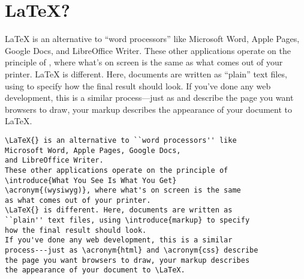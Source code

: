\section{\texorpdfstring{\LaTeX}{LaTeX}?}

\LaTeX{} is an alternative to ``word processors'' like
Microsoft Word, Apple Pages, Google Docs,
and LibreOffice Writer.
These other applications operate on the principle of
, where what's on screen is the same
as what comes out of your printer.
\LaTeX{} is different. Here, documents are written as
``plain'' text files, using  to specify
how the final result should look.
If you've done any web development, this is a similar
process---just as  and  describe
the page you want browsers to draw, your markup describes
the appearance of your document to \LaTeX.

\begin{samepage}
\begin{leftfigure}
\begin{lstlisting}
\LaTeX{} is an alternative to ``word processors'' like
Microsoft Word, Apple Pages, Google Docs,
and LibreOffice Writer.
These other applications operate on the principle of
\introduce{What You See Is What You Get}
\acronym{(wysiwyg)}, where what's on screen is the same
as what comes out of your printer.
\LaTeX{} is different. Here, documents are written as
``plain'' text files, using \introduce{markup} to specify
how the final result should look.
If you've done any web development, this is a similar
process---just as \acronym{html} and \acronym{css} describe
the page you want browsers to draw, your markup describes
the appearance of your document to \LaTeX.
\end{lstlisting}
\end{leftfigure}
\end{samepage}

